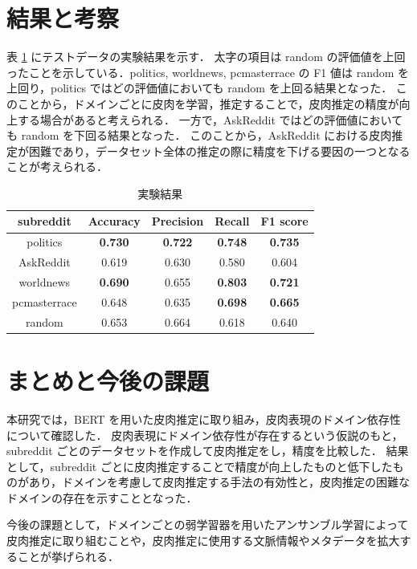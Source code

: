 \documentclass[a4paper,twoside,twocolumn,10pt]{article}
\begin{document}
\section{結果と考察}
表 \ref{tb:1_result} にテストデータの実験結果を示す．
太字の項目は random の評価値を上回ったことを示している．politics, worldnews, pcmasterrace の F1 値は random を上回り，politics ではどの評価値においても random を上回る結果となった．
このことから，ドメインごとに皮肉を学習，推定することで，皮肉推定の精度が向上する場合があると考えられる．
一方で，AskReddit ではどの評価値においても random を下回る結果となった．
このことから，AskReddit における皮肉推定が困難であり，データセット全体の推定の際に精度を下げる要因の一つとなることが考えられる．




\begin{table}[tb]
  \caption{実験結果}
  \label{tb:1_result}
  \centering
  \begin{tabular}{c c c c c} \hline

subreddit & Accuracy & Precision & Recall & F1 score\\ \hline
politics & \textbf{0.730} & \textbf{0.722} & \textbf{0.748} & \textbf{0.735} \\
AskReddit & 0.619 & 0.630 & 0.580 & 0.604 \\
worldnews & \textbf{0.690} & 0.655 & \textbf{0.803} & \textbf{0.721} \\
pcmasterrace & 0.648 & 0.635 & \textbf{0.698} & \textbf{0.665} \\ \hline
random & 0.653 & 0.664 & 0.618 & 0.640 \\ \hline

  \end{tabular}
\end{table}




\section{まとめと今後の課題}
本研究では，BERT を用いた皮肉推定に取り組み，皮肉表現のドメイン依存性について確認した．
皮肉表現にドメイン依存性が存在するという仮説のもと，subreddit ごとのデータセットを作成して皮肉推定をし，精度を比較した．
結果として，subreddit ごとに皮肉推定することで精度が向上したものと低下したものがあり，ドメインを考慮して皮肉推定する手法の有効性と，皮肉推定の困難なドメインの存在を示すこととなった．\par
今後の課題として，ドメインごとの弱学習器を用いたアンサンブル学習によって皮肉推定に取り組むことや，皮肉推定に使用する文脈情報やメタデータを拡大することが挙げられる．







\end{document}
